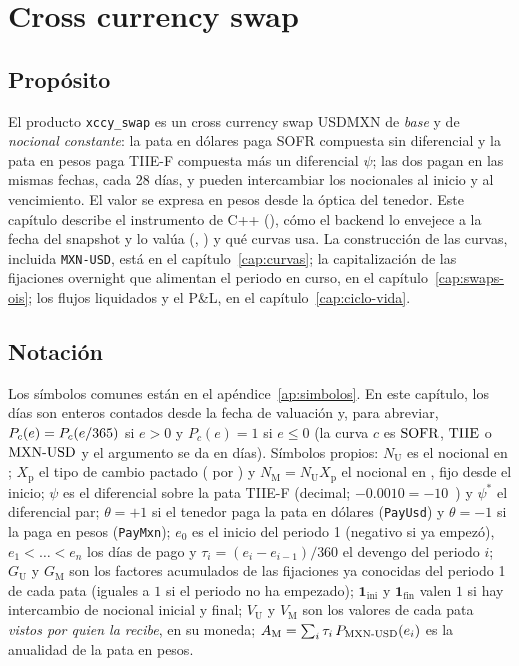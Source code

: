 \chapter{Cross currency swap}\label{cap:xccy}

\section{Propósito}\label{sec:cap07-proposito}

El producto \texttt{xccy\_swap} es un cross currency swap USDMXN de \emph{base} y de \emph{nocional constante}: la
pata en dólares paga SOFR compuesta sin diferencial y la pata en pesos paga TIIE-F compuesta más un
diferencial $\psi$; las dos pagan en las mismas fechas, cada 28 días, y pueden intercambiar los nocionales al
inicio y al vencimiento. El valor se expresa en pesos desde la óptica del tenedor. Este capítulo describe el
instrumento de C++ (), cómo el backend lo envejece a
la fecha del snapshot y lo valúa (, ) y qué
curvas usa. La construcción de las curvas, incluida \texttt{MXN-USD}, está en el capítulo~\ref{cap:curvas}; la
capitalización de las fijaciones overnight que alimentan el periodo en curso, en el
capítulo~\ref{cap:swaps-ois}; los flujos liquidados y el P\&L, en el capítulo~\ref{cap:ciclo-vida}.

\section{Notación}\label{sec:cap07-notacion}

Los símbolos comunes están en el apéndice~\ref{ap:simbolos}. En este capítulo, los días son enteros contados
desde la fecha de valuación y, para abreviar, $P_c(e)=P_{c}(e/365)$ si $e>0$ y $P_c(e)=1$ si $e\le0$ (la
curva $c$ es $\mathrm{SOFR}$, $\mathrm{TIIE}$ o $\mathrm{MXN\text{-}USD}$ y el argumento se da en días). Símbolos propios:
$N_{\mathrm U}$ es el nocional en \USD{}; $X_{\mathrm p}$ el tipo de cambio pactado (\MXN{} por \USD{}) y
$N_{\mathrm M}=N_{\mathrm U}X_{\mathrm p}$ el nocional en \MXN{}, fijo desde el inicio;
$\psi$ es el diferencial sobre la pata TIIE-F (decimal; $-0.0010=-10$~\pb) y $\psi^{*}$ el diferencial par;
$\theta=+1$ si el tenedor paga la pata en dólares (\texttt{PayUsd}) y $\theta=-1$ si la paga en pesos
(\texttt{PayMxn});
$e_0$ es el inicio del periodo 1 (negativo si ya empezó), $e_1<\dots<e_n$ los días de pago y
$\tau_i=(e_i-e_{i-1})/360$ el devengo del periodo $i$;
$G_{\mathrm U}$ y $G_{\mathrm M}$ son los factores acumulados de las fijaciones ya conocidas del periodo 1 de
cada pata (iguales a $1$ si el periodo no ha empezado);
$\mathbf 1_{\mathrm{ini}}$ y $\mathbf 1_{\mathrm{fin}}$ valen $1$ si hay intercambio de nocional inicial y
final;
$V_{\mathrm U}$ y $V_{\mathrm M}$ son los valores de cada pata \emph{vistos por quien la recibe}, en su moneda;
$A_{\mathrm M}=\sum_i\tau_i\,P_{\mathrm{MXN\text{-}USD}}(e_i)$ es la anualidad de la pata en pesos.

